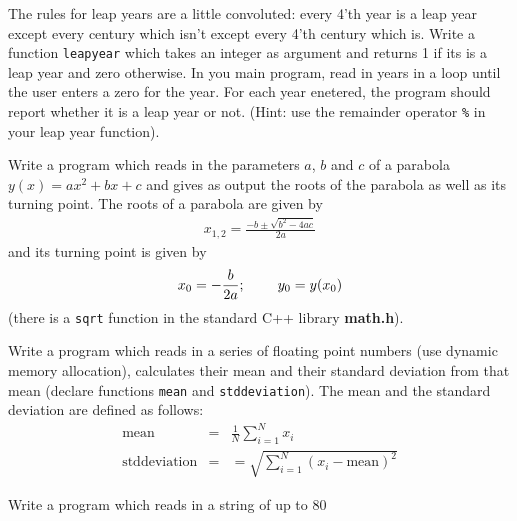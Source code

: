 
\begin{exercises}
  \item The rules for leap years are a little convoluted: every 4'th year is
        a leap year except every century which isn't except every 4'th century 
        which is.
         Write a function \verb+leapyear+ which takes an integer as argument
          and returns 1 if its is a leap year and zero otherwise. In you main program,
          read in years in a loop until the user enters a zero for the year. For
          each year enetered, the program should report whether it is a leap
          year or not. (Hint: use
          the remainder operator \verb+%+ in your leap year function).
  \item Write a program which reads in the parameters $a$, $b$ and $c$
          of a parabola $y(x) \! = \! ax^2+bx+c$ and gives as output the roots
          of the parabola as well as its turning point. The roots of a parabola
          are given by
          \begin{eqnarray}
             x_{1,2} = \frac{-b \pm \sqrt{b^2 - 4ac}}{2a}
          \nonumber \end{eqnarray}
          and its turning point is given by
          \begin{eqnarray}
            x_0 = - \frac{b}{2a}; \hspace{8mm} y_0 = y(x_0)
          \end{eqnarray}
          (there is a \verb+sqrt+ function in the standard C++ library {\bf math.h}).
  \item Write a program which reads in a series of floating point numbers
         (use dynamic memory allocation), calculates their mean and their
         standard deviation from that mean (declare functions
         \verb+mean+ and \verb+stddeviation+).
         The mean and the standard deviation are defined as follows:
         \begin{eqnarray}
            \mbox{mean}        &=& \frac{1}{N} \sum_{i=1}^N x_i \nonumber \\
            \mbox{stddeviation} &=& = \sqrt{\sum_{i=1}^N (x_i - \mbox{mean})^2}
                \nonumber
         \end{eqnarray}
  \item Write a program which reads in a string  of up to 80

\end{exercises}
